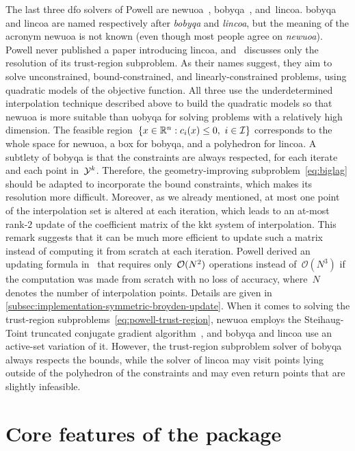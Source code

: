 The last three \gls{dfo} solvers of Powell are \gls{newuoa}~\cite{Powell_2006, Powell_2008}, \gls{bobyqa}~\cite{Powell_2009}, and~\gls{lincoa}.
\Gls{bobyqa} and \gls{lincoa} are named respectively after \emph{\glsdesc{bobyqa}} and \emph{\glsdesc{lincoa}}, but the meaning of the acronym \gls{newuoa} is not known (even though most people agree on \emph{\glsdesc{newuoa}}).
Powell never published a paper introducing \gls{lincoa}, and~\cite{Powell_2015} discusses only the resolution of its trust-region subproblem.
As their names suggest, they aim to solve unconstrained, bound-constrained, and linearly-constrained problems, using quadratic models of the objective function.
All three use the underdetermined interpolation technique described above to build the quadratic models so that \gls{newuoa} is more suitable than \gls{uobyqa} for solving problems with a relatively high dimension.
The feasible region~$\set{\iter \in \R^n : \con{i}(\iter) \le 0, ~ i \in \iub}$ corresponds to the whole space for \gls{newuoa}, a box for \gls{bobyqa}, and a polyhedron for \gls{lincoa}.
A subtlety of \gls{bobyqa} is that the constraints are always respected, for each iterate and each point in~$\xpt[k]$.
Therefore, the geometry-improving subproblem~\cref{eq:biglag} should be adapted to incorporate the bound constraints, which makes its resolution more difficult.
Moreover, as we already mentioned, at most one point of the interpolation set is altered at each iteration, which leads to an at-most rank-$2$ update of the coefficient matrix of the \gls{kkt} system of interpolation.
This remark suggests that it can be much more efficient to update such a matrix instead of computing it from scratch at each iteration.
Powell derived an updating formula in~\cite{Powell_2004b} that requires only~$\operatorname{\mathcal{O}}(N^2)$ operations instead of~$\mathcal{O}(N^3)$ if the computation was made from scratch with no loss of accuracy, where~$N$ denotes the number of interpolation points.
Details are given in \cref{subsec:implementation-symmetric-broyden-update}.
When it comes to solving the trust-region subproblems~\cref{eq:powell-trust-region}, \gls{newuoa} employs the Steihaug-Toint truncated conjugate gradient algorithm~\cite{Steihaug_1983,Toint_1981}, and \gls{bobyqa} and \gls{lincoa} use an active-set variation of it.
However, the trust-region subproblem solver of \gls{bobyqa} always respects the bounds, while the solver of \gls{lincoa} may visit points lying outside of the polyhedron of the constraints and may even return points that are slightly infeasible.

\section{Core features of the  package}


